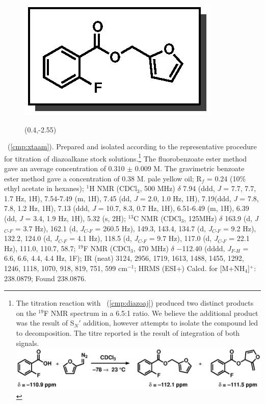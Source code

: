 \pagebreak
\begin{figure}
  \vspace{-18pt}
  \begin{center}
    \includegraphics[scale=0.8]{chp_asymmetric/images/xtaam}
          \begin{textblock}{1}(0.4,-2.55)  \end{textblock}
  \end{center}
  \vspace{-35pt}
\end{figure}\noindent \textbf{\CMPxtaam}\ (\ref{cmp:xtaam}). Prepared and
isolated according to the representative procedure for titration of diazoalkane
stock solutions.\footnote{The titration reaction with
\CMPdiazoaj~(\ref{cmp:diazoaj}) produced two distinct products on the $^{19}$F
NMR spectrum in a 6.5:1 ratio. We believe the additional product was the result of S$_{N}$$'$ addition, however attempts to isolate the compound led to decomposition. The
titre reported is the result of integration of both signals.\\
\includegraphics[scale=0.7]{chp_asymmetric/images/xtaamscheme}} The
fluorobenzoate ester method gave an average concentration of 0.310 $\pm$ 0.009
M. The gravimetric benzoate ester method gave a concentration of 0.38 M. pale
yellow oil; R$_f$ = 0.24 (10\% ethyl acetate in hexanes); $^1$H NMR (CDCl$_3$, 500 MHz) $\delta$ 7.94 (ddd, \textit{J} = 7.7, 7.7, 1.7 Hz, 1H),
7.54-7.49 (m, 1H), 7.45 (dd, \textit{J} = 2.0, 1.0 Hz, 1H), 7.19(ddd, \textit{J}
= 7.8, 7.8, 1.2 Hz, 1H), 7.13 (ddd, \textit{J} = 10.7, 8.3, 0.7 Hz, 1H),
6.51-6.49 (m, 1H), 6.39 (dd, \textit{J} = 3.4, 1.9 Hz, 1H), 5.32 (s, 2H);
$^{13}$C NMR (CDCl$_3$, 125MHz) $\delta$ 163.9 (d, \textit{J}$_{C\mbox{-}F}$ =
3.7 Hz), 162.1 (d, \textit{J}$_{C\mbox{-}F}$ = 260.5 Hz), 149.3, 143.4, 134.7
(d, \textit{J}$_{C\mbox{-}F}$ = 9.2 Hz), 132.2, 124.0 (d, \textit{J}$_{C\mbox{-}F}$
= 4.1 Hz), 118.5 (d, \textit{J}$_{C\mbox{-}F}$ = 9.7 Hz), 117.0 (d,
\textit{J}$_{C\mbox{-}F}$ = 22.1 Hz), 111.0, 110.7, 58.7; $^{19}$F NMR
(CDCl$_3$, 470 MHz) $\delta$ $-$112.40 (dddd, \textit{J}$_{F\mbox{-}H}$ = 6.6,
6.6, 4.4, 4.4 Hz, 1F); IR (neat) 3124, 2956, 1719, 1613, 1488, 1455, 1292, 1246,
1118, 1070, 918, 819, 751, 599 cm$^{-1}$; HRMS (ESI+) Calcd. for 
[M+NH$_4$]$^+$: 238.0879; Found 238.0876.

